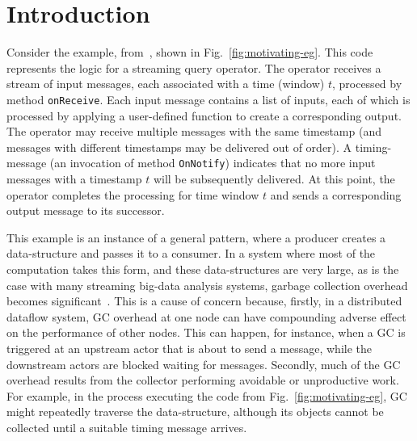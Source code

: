 \newcommand{\TODO}[1]{\textbf{TODO: #1}} \newcommand{\eg}{\emph{e.g.}}
\newcommand{\ie}{\emph{i.e.}}

\section{Introduction} \label{sec:introduction}

Consider the example, from~\cite{Broom:HotOS}, shown in
Fig.~\ref{fig:motivating-eg}.  This code represents the logic for a
streaming query operator.  The operator receives a stream of input
messages, each associated with a time (window) $t$, processed by
method \texttt{onReceive}.  Each input message contains a list of
inputs, each of which is processed by applying a user-defined function
to create a corresponding output.  The operator may receive multiple
messages with the same timestamp (and messages with different
timestamps may be delivered out of order).  A timing-message (an
invocation of method \texttt{OnNotify}) indicates that no more input
messages with a timestamp $t$ will be subsequently delivered.  At this
point, the operator completes the processing for time window $t$ and
sends a corresponding output message to its successor.



This example is an instance of a general pattern, where a producer
creates a data-structure and passes it to a consumer. In a system
where most of the computation takes this form, and these
data-structures are very large, as is the case with many streaming
big-data analysis systems, garbage collection overhead becomes
significant~\cite{Broom:HotOS}. This is a cause of concern because,
firstly, in a distributed dataflow system, GC overhead at one node can
have compounding adverse effect on the performance of other nodes.
This can happen, for instance, when a GC is triggered at an upstream
actor that is about to send a message, while the downstream actors are
blocked waiting for messages. Secondly, much of the GC overhead
results from the collector performing avoidable or unproductive work.
For example, in the process executing the code from
Fig.~\ref{fig:motivating-eg}, GC might repeatedly traverse the 
data-structure, although its objects cannot be collected until a
suitable timing message arrives.


